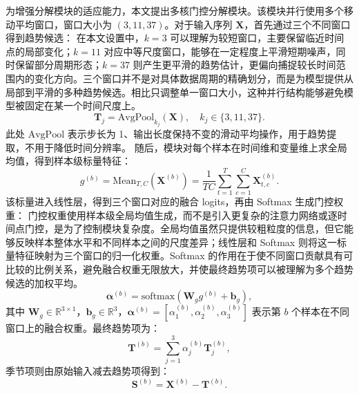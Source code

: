 为增强分解模块的适应能力，本文提出多核门控分解模块。该模块并行使用多个移动平均窗口，窗口大小为 $(3,11,37)$。对于输入序列 $\mathbf{X}$，首先通过三个不同窗口得到趋势候选：
在本文设置中，$k=3$ 可以理解为较短窗口，主要保留临近时间点的局部变化；$k=11$ 对应中等尺度窗口，能够在一定程度上平滑短期噪声，同时保留部分周期形态；$k=37$ 则产生更平滑的趋势估计，更偏向捕捉较长时间范围内的变化方向。三个窗口并不是对具体数据周期的精确划分，而是为模型提供从局部到平滑的多种趋势候选。相比只调整单一窗口大小，这种并行结构能够避免模型被固定在某一个时间尺度上。
\begin{equation}
    \mathbf{T}_j = \mathrm{AvgPool}_{k_j}(\mathbf{X}), \quad k_j \in \{3,11,37\}.
\end{equation}
此处 $\mathrm{AvgPool}$ 表示步长为 1、输出长度保持不变的滑动平均操作，用于趋势提取，不用于降低时间分辨率。
随后，模块对每个样本在时间维和变量维上求全局均值，得到样本级标量特征：
\begin{equation}
    g^{(b)}=\mathrm{Mean}_{T,C}(\mathbf{X}^{(b)})
    =\frac{1}{TC}\sum_{t=1}^{T}\sum_{c=1}^{C}\mathbf{X}^{(b)}_{t,c}.
\end{equation}
该标量进入线性层，得到三个窗口对应的融合 logits，再由 Softmax 生成门控权重：
门控权重使用样本级全局均值生成，而不是引入更复杂的注意力网络或逐时间点门控，是为了控制模块复杂度。全局均值虽然只提供较粗粒度的信息，但它能够反映样本整体水平和不同样本之间的尺度差异；线性层和 Softmax 则将这一标量特征映射为三个窗口的归一化权重。Softmax 的作用在于使不同窗口贡献具有可比较的比例关系，避免融合权重无限放大，并使最终趋势项可以被理解为多个趋势候选的加权平均。
\begin{equation}
    \boldsymbol{\alpha}^{(b)} = \mathrm{softmax}(\mathbf{W}_{g}g^{(b)}+\mathbf{b}_{g}),
\end{equation}
其中 $\mathbf{W}_{g}\in\mathbb{R}^{3\times1}$，$\mathbf{b}_{g}\in\mathbb{R}^{3}$，$\boldsymbol{\alpha}^{(b)}=[\alpha_1^{(b)},\alpha_2^{(b)},\alpha_3^{(b)}]$ 表示第 $b$ 个样本在不同窗口上的融合权重。最终趋势项为：
\begin{equation}
    \mathbf{T}^{(b)} = \sum_{j=1}^{3} \alpha_j^{(b)} \mathbf{T}_j^{(b)},
\end{equation}
季节项则由原始输入减去趋势项得到：
\begin{equation}
    \mathbf{S}^{(b)} = \mathbf{X}^{(b)} - \mathbf{T}^{(b)}.
\end{equation}

